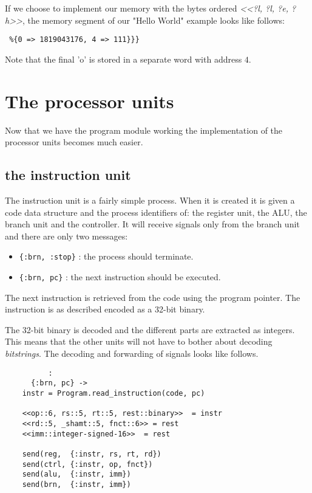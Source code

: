 \documentclass[a4paper,11pt]{article}
\begin{document}
If we choose to implement our memory with the bytes ordered {\em <<?l,
  ?l, ?e, ?h>>}, the memory segment of our "Hello World" example looks
like follows:

\begin{verbatim}
 %{0 => 1819043176, 4 => 111}}}
\end{verbatim}

Note that the final 'o' is stored in a separate word with address $4$.

\section{The processor units}

Now that we have the program module working the implementation of the
processor units becomes much easier.

\subsection*{the instruction unit}

The instruction unit is a fairly simple process. When it is created it
is given a code data structure and the process identifiers of: the
register unit, the ALU, the branch unit and the controller. It will
receive signals only from the branch unit and there are only two messages:

\begin{itemize}
\item {\tt \{:brn, :stop\}} : the process should terminate.
  
\item {\tt \{:brn, pc\}} : the next instruction should be executed.
\end{itemize}

The next instruction is retrieved from the code using the program
pointer. The instruction is as described encoded as a 32-bit binary.

The 32-bit binary is decoded and the different parts are extracted as
integers. This means that the other units will not have to bother
about decoding {\em bitstrings}. The decoding and forwarding of signals
looks like follows.

\begin{verbatim}
          :
      {:brn, pc} ->
	instr = Program.read_instruction(code, pc)

	<<op::6, rs::5, rt::5, rest::binary>>  = instr
	<<rd::5, _shamt::5, fnct::6>> = rest
	<<imm::integer-signed-16>>  = rest

	send(reg,  {:instr, rs, rt, rd})	    
	send(ctrl, {:instr, op, fnct})
	send(alu,  {:instr, imm})
	send(brn,  {:instr, imm})
\end{verbatim}
\end{document}
